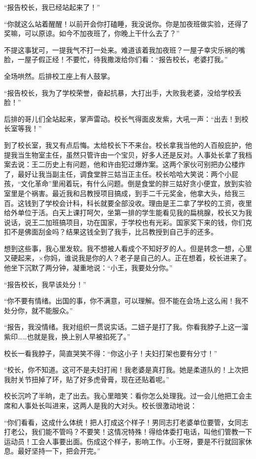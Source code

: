  “报告校长，我已经站起来了！” 
 
 “你就这么站着醒醒！以前开会你打磕睡，我没说你。你是加夜班做实验，还得了奖嘛，可以原谅。如今不加夜班了，你晚上干什么去了？” 
 
 不提这事犹可，一提我气不打一处来。难道该着我加夜班？一屋子幸灾乐祸的嘴脸，一屋子假正经！不要忙，待我撒泼给你们看：“报告校长，老婆打我。” 
 
 全场哄然。后排校工座上有人鼓掌。 
 
 “报告校长，我为了学校荣誉，奋起抗暴，大打出手，大败我老婆，没给学校丢脸！” 
 
 后排的哥儿们全站起来，掌声雷动。校长气得面皮发紫，大吼一声：“出去！到校长室等我！” 
 
 到了校长室，我又有点后悔。太给校长下不来台。校长拿我当他的人百般庇护，他提我当生物室主任，虽然只管许由一个宝贝，好多人还是反对。人事处长拿了我档案去说：王二历史上有问题，他和许由犯过爆炸案。这两个家伙可别把办公楼炸了，最好让我当副主任，调食堂胖三姑当正主任。校长哈哈大笑说：两个小屁孩，“文化革命”里闹着玩，有什么问题。倒是食堂的胖三姑好贪小便宜，放到实验室里是个祸害。最近我和吕教授项目搞成，到手二千元奖金，他拿大头，给我三百。这钱到了学校会计科，科长就要全部没收。理由是王二拿了学校的工资，夜里给外单位于活。白天上课打呵欠，坐第一排的学生能看见我的扁桃腺，校长又为我说话，说王二加班搞项目，功在国家，于学校也有光彩。国家奖下来的钱，你们克扣不是佛面刮金吗？结果这钱全到了我手，比吕教授到自己手的还多。 
 
 想到这些事，我心里发软。我不想被人看成个不知好歹的人。但是转念一想，心里又硬起来，×你妈，谁说我是你的人？老子是自己的人。正在想着，校长进来了。他坐下沉默了两分钟，凝重地说：“小王，我要处分你。” 
 
 “报告校长，我早该处分！” 
 
 “你不要有情绪。出国的事，你不满意，可以理解。但不能在会场上这么闹！我不处分你，就不能服众。” 
 
 “报告，我没情绪。我对组织一贯说实话。二妞子是打了我。你看我脖子上这一溜紫印……也就是我，换上别人早被掐死了。” 
 
 校长一看我脖子，简直哭笑不得：“你这小子！夫妇打架也要有分寸！” 
 
 “校长，你不知道。这可不是夫妇打闹！我老婆是真打我。她是柔道队的！上次把我肘关节扭掉了环，贴了好多虎骨膏，现在还贴着呢。” 
 
 校长沉吟了半晌，走了出去。我心里暗笑：看你怎么处理我。过一会儿他把工会主席和人事处长叫进来，这两人是我的大对头。校长很激动地说： 
 
 “你们看看，这成什么体统！把人打成这个样子！男同志打老婆单位要管，女同志打老公，我们能不管吗？不要笑！这情况特殊！得给体委打电话，叫他们管教一下运动员！工会人事要出面。伤成这个样子，影响工作。小王呀，要是不行就回家休息。最好坚持一下，把会开完。” 
 
